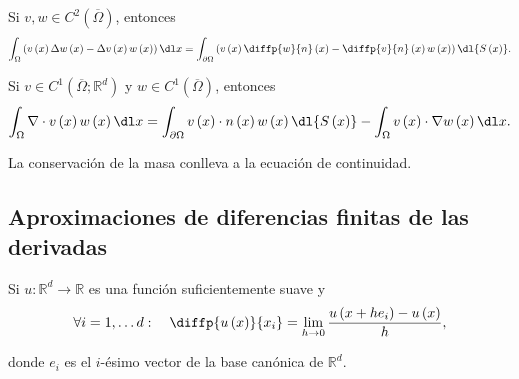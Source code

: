 \begin{theorem}
\begin{description}
              Si $v,w\in C^{2}\left(\overline{\Omega}\right)$, entonces
              \begin{equation*}
                  \int_{\Omega}
                  \left(
                  v\left(x\right)
                  \Delta w\left(x\right)-
                  \Delta v\left(x\right)
                  w\left(x\right)
                  \right)
                  \dl x=
                  \int_{\partial\Omega}
                  \left(
                  v\left(x\right)
                  \diffp{w}{n}\left(x\right)-
                  \diffp{v}{n}\left(x\right)
                  w\left(x\right)
                  \right)
                  \dl{S\left(x\right)}.
              \end{equation*}

        \item[]

              Si $v\in C^{1}\left(\overline{\Omega};\mathbb{R}^{d}\right)$ y
              $w\in C^{1}\left(\overline{\Omega}\right)$, entonces
              \begin{equation*}
                  \int_{\Omega}\nabla\cdot v\left(x\right)
                  w\left(x\right)
                  \dl x=
                  \int_{\partial\Omega}
                  v\left(x\right)\cdot
                  n\left(x\right)
                  w\left(x\right)
                  \dl{S\left(x\right)}-
                  \int_{\Omega}
                  v\left(x\right)\cdot
                  \nabla w\left(x\right)
                  \dl x.
              \end{equation*}
    \end{description}
\end{theorem}

La conservación de la masa conlleva a la ecuación de continuidad.

\subsection{Aproximaciones de diferencias finitas de las derivadas}

Si $u\colon\mathbb{R}^d\to\mathbb{R}$ es una función suficientemente
suave y
\begin{equation*}
    \forall i=1,\dotsc d:\quad
    \diffp{u\left(x\right)}{x_{i}}=
    \lim\limits_{h\to0}
    \dfrac{
        u\left(x+he_{i}\right)-
        u\left(x\right)}{h},
\end{equation*}

donde $e_{i}$ es el $i$-ésimo vector de la base canónica de
$\mathbb{R}^d$.

